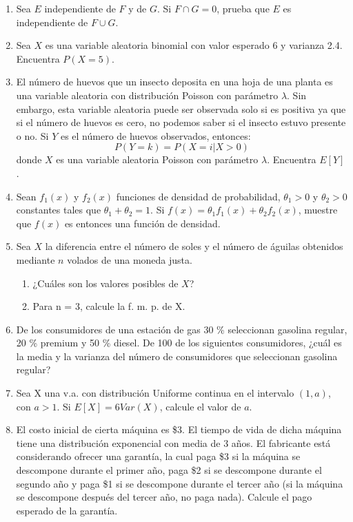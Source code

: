 \documentclass{report}
\begin{document}
\begin{enumerate}
    \item Sea $E$ independiente de $F$ y de $G$. Si $F\cap G = 0$, prueba que $E$ es independiente de $F\cup G$.
    \item Sea $X$ es una variable aleatoria binomial con valor esperado 6 y varianza 2.4. Encuentra $P(X=5)$.
    \item El número de huevos que un insecto deposita en una hoja de una planta es una variable aleatoria con distribución Poisson con parámetro $\lambda$. Sin embargo, esta variable aleatoria puede ser observada solo si es positiva ya que si el número de huevos es cero, no podemos saber si el insecto estuvo presente o no. Si $Y$ es el número de huevos observados, entonces:
    $$
    P(Y=k)=P(X=i\vert X > 0)
    $$
    donde $X$ es una variable aleatoria Poisson con parámetro $\lambda$. Encuentra $E[Y]$.
 
    \item Sean $f_1(x)$ y $f_2(x)$ funciones de densidad de probabilidad, $\theta_1 > 0$ y $\theta_2 > 0$ constantes tales que $\theta_1 + \theta_2 = 1$. Si $f(x) = \theta_1 f_1(x) + \theta_2f_2(x)$, muestre que $f(x)$ es entonces una función de densidad.

    \item Sea $X$ la diferencia entre el número de soles y el número de águilas obtenidos mediante $n$ volados de una moneda justa.
          \begin{enumerate}
              \item ¿Cuáles son los valores posibles de $X$?
              \item Para n = 3, calcule la f. m. p. de X.
          \end{enumerate}

    \item De los consumidores de una estación de gas 30 \% seleccionan gasolina regular, 20 \% premium y 50 \% diesel. De 100 de los siguientes consumidores, ¿cuál es la media y la varianza del número de consumidores que seleccionan gasolina regular?

    \item Sea X una v.a. con distribución Uniforme continua en el intervalo $(1, a)$, con $a > 1$. Si $E[X] = 6 Var(X)$, calcule el valor de $a$.

    \item El costo inicial de cierta máquina es \$3. El tiempo de vida de dicha máquina tiene una distribución exponencial con media de 3 años. El fabricante está considerando ofrecer una garantía, la cual paga \$3 si la máquina se descompone durante el primer año, paga \$2 si se descompone durante el segundo año y paga \$1 si se descompone durante el tercer año (si la máquina se descompone después del tercer año, no paga nada). Calcule el pago esperado de la garantía.


\end{enumerate}
\end{document}
